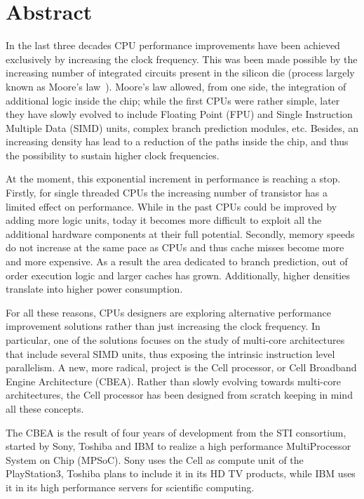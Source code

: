 \chapter*{Abstract}
\setcounter{footnote}{0}

In the last three decades CPU performance improvements have been achieved exclusively by increasing the clock frequency. This was been made possible by the increasing number of integrated circuits present in the silicon die (process largely known as Moore's law~\cite{moore}). Moore's law allowed, from one side, the integration of additional logic inside the chip; while the first CPUs were rather simple, later they have slowly evolved to include Floating Point (FPU) and Single Instruction Multiple Data (SIMD) units, complex branch prediction modules, etc. Besides, an increasing density has lead to a reduction of the paths inside the chip, and thus the possibility to sustain higher clock frequencies.

At the moment, this exponential increment in performance is reaching a stop. Firstly, for single threaded CPUs the increasing number of transistor has a limited effect on performance. While in the past CPUs could be improved by adding more logic units, today it becomes more difficult to exploit all the additional hardware components at their full potential. Secondly, memory speeds do not increase at the same pace as CPUs and thus cache misses become more and more expensive. As a result the area dedicated to branch prediction, out of order execution logic and larger caches has grown. Additionally, higher densities translate into higher power consumption.

For all these reasons, CPUs designers are exploring alternative performance improvement solutions rather than just increasing the clock frequency. In particular, one of the solutions focuses on the study of multi-core architectures that include several SIMD units, thus exposing the intrinsic instruction level parallelism. A new, more radical, project is the Cell processor, or Cell Broadband Engine Architecture (CBEA). Rather than slowly evolving towards multi-core architectures, the Cell processor has been designed from scratch keeping in mind all these concepts.

The CBEA is the result of four years of development from the STI consortium, started by Sony, Toshiba and IBM to realize a high performance MultiProcessor System on Chip (MPSoC). Sony uses the Cell as compute unit of the PlayStation3, Toshiba plans to include it in its HD TV products, while IBM uses it in its high performance servers for scientific computing.


